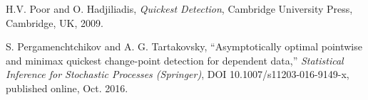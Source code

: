 \documentclass[journal,10pt]{IEEEtran}
\begin{document}
\begin{thebibliography}{1}
H.V. Poor and O. Hadjiliadis, {\em Quickest Detection}, Cambridge University Press, Cambridge, UK, 2009. 

S. Pergamenchtchikov and A. G. Tartakovsky, ``Asymptotically optimal pointwise and minimax quickest change-point detection for dependent data,'' {\em Statistical Inference for Stochastic Processes (Springer)}, DOI 10.1007/s11203-016-9149-x, published online, Oct. 2016. 



\end{thebibliography}
\end{document}
